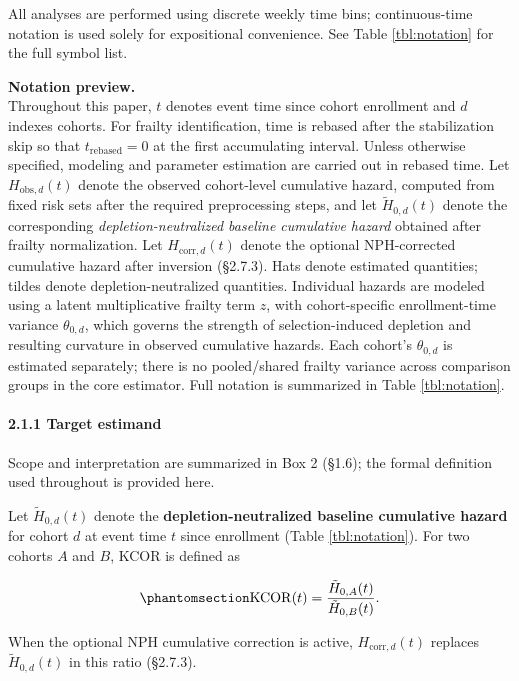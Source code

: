 \documentclass[
]{article}
\begin{document}
All analyses are performed using discrete weekly time bins; continuous-time notation is used solely for expositional convenience. See Table \ref{tbl:notation} for the full symbol list.

\textbf{Notation preview.}\\
Throughout this paper, \(t\) denotes event time since cohort enrollment and \(d\) indexes cohorts. For frailty identification, time is rebased after the stabilization skip so that \(t_{\mathrm{rebased}}=0\) at the first accumulating interval. Unless otherwise specified, modeling and parameter estimation are carried out in rebased time. Let \(H_{\mathrm{obs},d}(t)\) denote the observed cohort-level cumulative hazard, computed from fixed risk sets after the required preprocessing steps, and let \(\tilde H_{0,d}(t)\) denote the corresponding \emph{depletion-neutralized baseline cumulative hazard} obtained after frailty normalization. Let \(H_{\mathrm{corr},d}(t)\) denote the optional NPH-corrected cumulative hazard after inversion (§2.7.3). Hats denote estimated quantities; tildes denote depletion-neutralized quantities. Individual hazards are modeled using a latent multiplicative frailty term \(z\), with cohort-specific enrollment-time variance \(\theta_{0,d}\), which governs the strength of selection-induced depletion and resulting curvature in observed cumulative hazards. Each cohort's \(\theta_{0,d}\) is estimated separately; there is no pooled/shared frailty variance across comparison groups in the core estimator. Full notation is summarized in Table \ref{tbl:notation}.

\paragraph{2.1.1 Target estimand}\label{target-estimand}

Scope and interpretation are summarized in Box 2 (§1.6); the formal definition used throughout is provided here.

Let \(\tilde H_{0,d}(t)\) denote the \textbf{depletion-neutralized baseline cumulative hazard} for cohort \(d\) at event time \(t\) since enrollment (Table \ref{tbl:notation}). For two cohorts \(A\) and \(B\), KCOR is defined as

\begin{equation}\protect\phantomsection\label{eq:kcor-estimand}{\mathrm{KCOR}(t) = \frac{\tilde H_{0,A}(t)}{\tilde H_{0,B}(t)}.}\end{equation}

When the optional NPH cumulative correction is active, \(H_{\mathrm{corr},d}(t)\) replaces \(\tilde H_{0,d}(t)\) in this ratio (§2.7.3).
\end{document}
